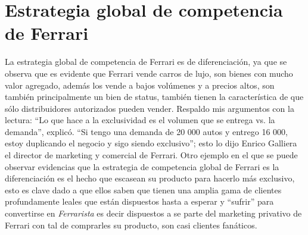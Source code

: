 \documentclass{article}
\begin{document}
\section{Estrategia global de competencia de Ferrari}
La estrategia global de competencia de Ferrari es de diferenciación, ya que se observa que es evidente que Ferrari vende carros de lujo, son bienes con mucho valor agregado, además los vende a bajos volúmenes y a precios altos, son también principalmente un bien de status, también tienen la característica de que sólo distribuidores autorizados pueden vender. \newline 
Respaldo mis argumentos con la lectura: ``Lo que hace a la exclusividad es el volumen que se entrega vs. la demanda'', explicó. ``Si tengo una demanda de 20 000 autos y entrego 16 000, estoy duplicando el negocio y sigo siendo exclusivo''; esto lo dijo Enrico Galliera el director de marketing y comercial de Ferrari. Otro ejemplo en el que se puede observar evidencias que la estrategia de competencia global de Ferrari es la diferenciación es el hecho que escasean su producto para hacerlo más exclusivo, esto es clave dado a que ellos saben que tienen una amplia gama de clientes profundamente leales que están dispuestos hasta a esperar y ``sufrir'' para convertirse en  \emph{Ferrarista} es decir dispuestos a se parte del marketing privativo de Ferrari con tal de comprarles su producto, son casi clientes fanáticos.



\end{document}
